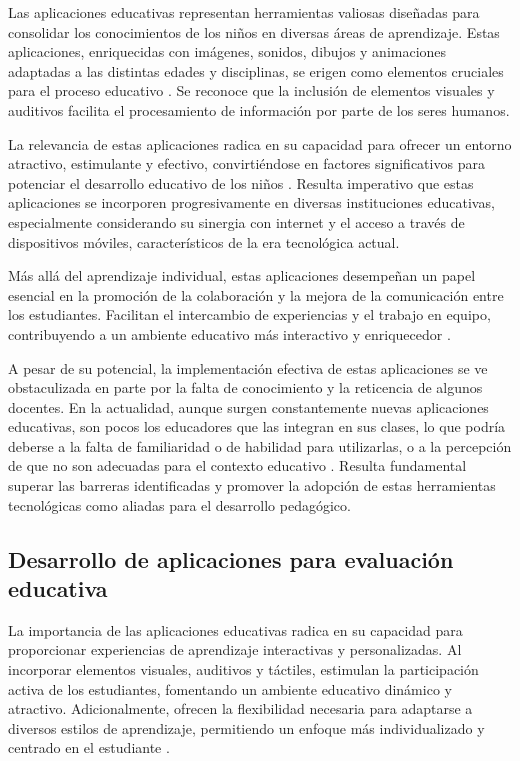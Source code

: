 Las aplicaciones educativas representan herramientas valiosas diseñadas para consolidar los conocimientos de los niños en diversas áreas de aprendizaje. Estas aplicaciones, enriquecidas con imágenes, sonidos, dibujos y animaciones adaptadas a las distintas edades y disciplinas, se erigen como elementos cruciales para el proceso educativo \cite{ref46_app_educativas}. Se reconoce que la inclusión de elementos visuales y auditivos facilita el procesamiento de información por parte de los seres humanos.

La relevancia de estas aplicaciones radica en su capacidad para ofrecer un entorno atractivo, estimulante y efectivo, convirtiéndose en factores significativos para potenciar el desarrollo educativo de los niños \cite{ref46_app_educativas}. Resulta imperativo que estas aplicaciones se incorporen progresivamente en diversas instituciones educativas, especialmente considerando su sinergia con internet y el acceso a través de dispositivos móviles, característicos de la era tecnológica actual.

Más allá del aprendizaje individual, estas aplicaciones desempeñan un papel esencial en la promoción de la colaboración y la mejora de la comunicación entre los estudiantes. Facilitan el intercambio de experiencias y el trabajo en equipo, contribuyendo a un ambiente educativo más interactivo y enriquecedor \cite{ref46_app_educativas}.

A pesar de su potencial, la implementación efectiva de estas aplicaciones se ve obstaculizada en parte por la falta de conocimiento y la reticencia de algunos docentes. En la actualidad, aunque surgen constantemente nuevas aplicaciones educativas, son pocos los educadores que las integran en sus clases, lo que podría deberse a la falta de familiaridad o de habilidad para utilizarlas, o a la percepción de que no son adecuadas para el contexto educativo \cite{ref08_ertmer}. Resulta fundamental superar las barreras identificadas y promover la adopción de estas herramientas tecnológicas como aliadas para el desarrollo pedagógico.

\subsection{Desarrollo de aplicaciones para evaluación educativa}

La importancia de las aplicaciones educativas radica en su capacidad para proporcionar experiencias de aprendizaje interactivas y personalizadas. Al incorporar elementos visuales, auditivos y táctiles, estimulan la participación activa de los estudiantes, fomentando un ambiente educativo dinámico y atractivo. Adicionalmente, ofrecen la flexibilidad necesaria para adaptarse a diversos estilos de aprendizaje, permitiendo un enfoque más individualizado y centrado en el estudiante \cite{ref46_app_educativas}.

